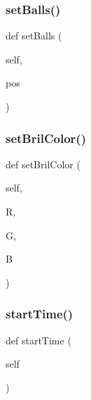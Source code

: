 \subsubsection{\texorpdfstring{set\+Balls()}{setBalls()}}
{\footnotesize\ttfamily def set\+Balls (\begin{DoxyParamCaption}\item[{}]{self,  }\item[{}]{pos }\end{DoxyParamCaption})}

\hypertarget{classgame_1_1_player_1_1player_a4fea2d8b13f9b59b91d3d14d5c28efc0}{}\label{classgame_1_1_player_1_1player_a4fea2d8b13f9b59b91d3d14d5c28efc0} 
\subsubsection{\texorpdfstring{set\+Bril\+Color()}{setBrilColor()}}
{\footnotesize\ttfamily def set\+Bril\+Color (\begin{DoxyParamCaption}\item[{}]{self,  }\item[{}]{R,  }\item[{}]{G,  }\item[{}]{B }\end{DoxyParamCaption})}

\hypertarget{classgame_1_1_player_1_1player_a1025dee804906a22181c3ea3a6f4fadc}{}\label{classgame_1_1_player_1_1player_a1025dee804906a22181c3ea3a6f4fadc} 
\subsubsection{\texorpdfstring{start\+Time()}{startTime()}}
{\footnotesize\ttfamily def start\+Time (\begin{DoxyParamCaption}\item[{}]{self }\end{DoxyParamCaption})}

\hypertarget{classgame_1_1_player_1_1player_a28e064aedf0753d6d5c30e46c4f791b5}{}\label{classgame_1_1_player_1_1player_a28e064aedf0753d6d5c30e46c4f791b5} 
